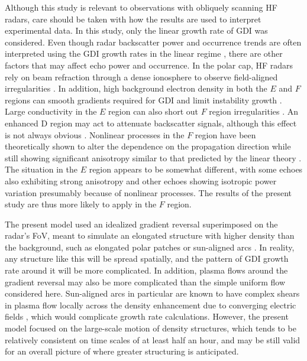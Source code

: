 Although this study is relevant to observations with obliquely scanning HF radars, care should be taken with how the results are used to interpret experimental data.  In this study, only the linear growth rate of GDI was considered. Even though radar backscatter power and occurrence trends are often interpreted using the GDI growth rates in the linear regime \citep[e.g.][]{Oksavik2012,Moen2012}, there are other factors that may affect echo power and occurrence.  In the polar cap, HF radars rely on beam refraction through a dense ionosphere to observe field-aligned irregularities \citep{Bristow2011,Koustov2014}.  In addition, high background electron density in both the \(E\) and \(F\) regions can smooth gradients required for GDI and limit instability growth \citep{Ruohoniemi1997,Koustov2004}.  Large conductivity in the \(E\) region can also short out \(F\) region irregularities \citep{Danskin2002,Kane2012,Lamarche2015}.  An enhanced D region may act to attenuate backscatter signals, although this effect is not always obvious \citep{Danskin2002}.  Nonlinear processes in the \(F\) region have been theoretically shown to alter the dependence on the propagation direction while still showing significant anisotropy similar to that predicted by the linear theory \citep{Keskinen1981b,Keskinen1982,Keskinen1983b}.  The situation in the \(E\) region appears to be somewhat different, with some echoes also exhibiting strong anisotropy \citep[e.g.][]{Ierkic1980,Makarevich2008} and other echoes showing isotropic power variation \citep{Ierkic1980,Koustov2001} presumably because of nonlinear processes.  The results of the present study are thus more likely to apply in the \(F\) region.


The present model used an idealized gradient reversal superimposed on the radar's FoV, meant to simulate an elongated structure with higher density than the background, such as elongated polar patches \citep{Hosokawa2014} or sun-aligned arcs \citep{Koustov2012}.  In reality, any structure like this will be spread spatially, and the pattern of GDI growth rate around it will be more complicated.  In addition, plasma flows around the gradient reversal may also be more complicated than the simple uniform flow considered here.  Sun-aligned arcs in particular are known to have complex shears in plasma flow locally across the density enhancement due to converging electric fields \citep[e.g.][]{Kozlovsky2007}, which would complicate growth rate calculations. However, the present model focused on the large-scale motion of density structures, which tends to be relatively consistent on time scales of at least half an hour, and may be still valid for an overall picture of where greater structuring is anticipated.


